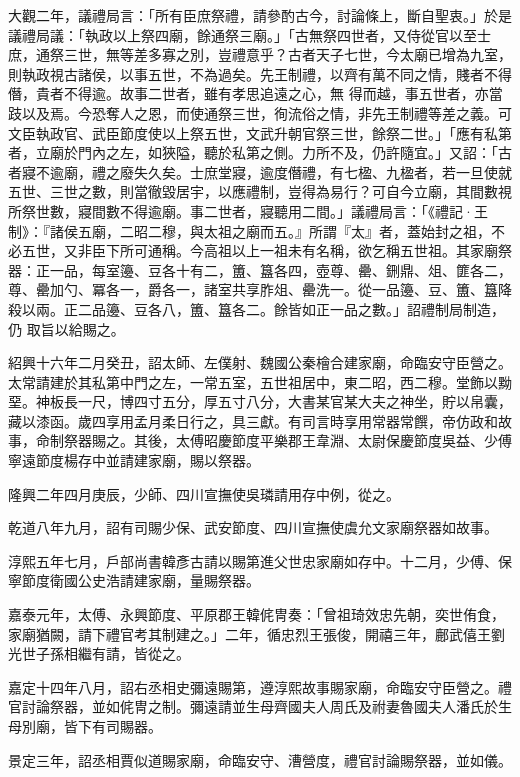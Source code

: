 \begin{pinyinscope}
 大觀二年，議禮局言：「所有臣庶祭禮，請參酌古今，討論條上，斷自聖衷。」於是議禮局議：「執政以上祭四廟，餘通祭三廟。」「古無祭四世者，又侍從官以至士庶，通祭三世，無等差多寡之別，豈禮意乎？古者天子七世，今太廟已增為九室，則執政視古諸侯，以事五世，不為過矣。先王制禮，以齊有萬不同之情，賤者不得僭，貴者不得逾。故事二世者，雖有孝思追遠之心，無
 得而越，事五世者，亦當跂以及焉。今恐奪人之恩，而使通祭三世，徇流俗之情，非先王制禮等差之義。可文臣執政官、武臣節度使以上祭五世，文武升朝官祭三世，餘祭二世。」「應有私第者，立廟於門內之左，如狹隘，聽於私第之側。力所不及，仍許隨宜。」又詔：「古者寢不逾廟，禮之廢失久矣。士庶堂寢，逾度僭禮，有七楹、九楹者，若一旦使就五世、三世之數，則當徹毀居宇，以應禮制，豈得為易行？可自今立廟，其間數視所祭世數，寢間數不得逾廟。事二世者，寢聽用二間。」議禮局言：「《禮記·王制》：『諸侯五廟，二昭二穆，與太祖之廟而五。』所謂『太』者，蓋始封之祖，不必五世，又非臣下所可通稱。今高祖以上一祖未有名稱，欲乞稱五世祖。其家廟祭器：正一品，每室籩、豆各十有二，簠、簋各四，壺尊、罍、鉶鼎、俎、篚各二，尊、罍加勺、冪各一，爵各一，諸室共享胙俎、罍洗一。從一品籩、豆、簠、簋降殺以兩。正二品籩、豆各八，簠、簋各二。餘皆如正一品之數。」詔禮制局制造，仍
 取旨以給賜之。



 紹興十六年二月癸丑，詔太師、左僕射、魏國公秦檜合建家廟，命臨安守臣營之。太常請建於其私第中門之左，一常五室，五世祖居中，東二昭，西二穆。堂飾以黝堊。神板長一尺，博四寸五分，厚五寸八分，大書某官某大夫之神坐，貯以帛囊，藏以漆函。歲四享用孟月柔日行之，具三獻。有司言時享用常器常饌，帝仿政和故事，命制祭器賜之。其後，太傅昭慶節度平樂郡王韋淵、太尉保慶節度吳益、少傅寧遠節度楊存中並請建家廟，賜以祭器。



 隆興二年四月庚辰，少師、四川宣撫使吳璘請用存中例，從之。



 乾道八年九月，詔有司賜少保、武安節度、四川宣撫使虞允文家廟祭器如故事。



 淳熙五年七月，戶部尚書韓彥古請以賜第進父世忠家廟如存中。十二月，少傅、保寧節度衛國公史浩請建家廟，量賜祭器。



 嘉泰元年，太傅、永興節度、平原郡王韓侂冑奏：「曾祖琦效忠先朝，奕世侑食，家廟猶闕，請下禮官考其制建之。」二年，循忠烈王張俊，開禧三年，鄜武僖王劉光世子孫相繼有請，皆從之。



 嘉定十四年八月，詔右丞相史彌遠賜第，遵淳熙故事賜家廟，命臨安守臣營之。禮官討論祭器，並如侂冑之制。彌遠請並生母齊國夫人周氏及祔妻魯國夫人潘氏於生母別廟，皆下有司賜器。



 景定三年，詔丞相賈似道賜家廟，命臨安守、漕營度，禮官討論賜祭器，並如儀。



\end{pinyinscope}